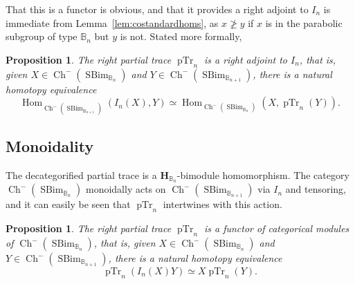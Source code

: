 \documentclass[11pt]{article}
\DeclareMathOperator{\Hom}{Hom}
\DeclareMathOperator{\Ch}{Ch}
\DeclareMathOperator{\SBim}{SBim}
\DeclareMathOperator{\pTr}{pTr}
\newtheorem{proposition}[thm]{Proposition}
\theoremstyle{definition}
\theoremstyle{remark}
\numberwithin{equation}{section}
\begin{document}
\noindent
That this is a functor is obvious, and that it provides a right adjoint to
$I_n$ is immediate from Lemma~\ref{lem:costandardhoms}, as $x\ngeq y$ if
$x$ is in the parabolic subgroup of type $\mathbb{B}_n$ but $y$ is not. Stated more
formally,
\begin{proposition}
	\label{prop:adjoint}
	The right partial trace $\pTr_n$ is a right adjoint to $I_n$, that is,
	given $X\in \Ch^-(\SBim_{\mathbb{B}_n})$ and
	$Y\in \Ch^-(\SBim_{\mathbb{B}_{n+1}})$,
	there is a natural homotopy equivalence
	\[\Hom_{\Ch^-(\SBim_{\mathbb{B}_{n+1}})}
	(I_n(X),Y)\simeq \Hom_{\Ch^-(\SBim_{\mathbb{B}_n})}(X,\pTr_n(Y)).\]
\end{proposition}
\subsection{Monoidality}
The decategorified partial trace is a $\mathbf{H}_{\mathbb{B}_n}$-bimodule
homomorphism. The category $\Ch^-(\SBim_{\mathbb{B}_n})$ monoidally acts on
$\Ch^-(\SBim_{\mathbb{B}_{n+1}})$ via $I_n$ and tensoring, and it can easily be
seen that $\pTr_n$ intertwines with this action.
\begin{proposition}
	\label{prop:monoidality}
	The right partial trace $\pTr_n$ is a functor of categorical modules
	of $\Ch^-(\SBim_{\mathbb{B}_n})$, that is, given $X\in \Ch^-(\SBim_{\mathbb{B}_n})$
	and $Y\in \Ch^-(\SBim_{\mathbb{B}_{n+1}})$, there is a natural homotopy equivalence
	\[\pTr_n(I_n(X)Y)\simeq X\pTr_n(Y).\]
\end{proposition}
\end{document}
